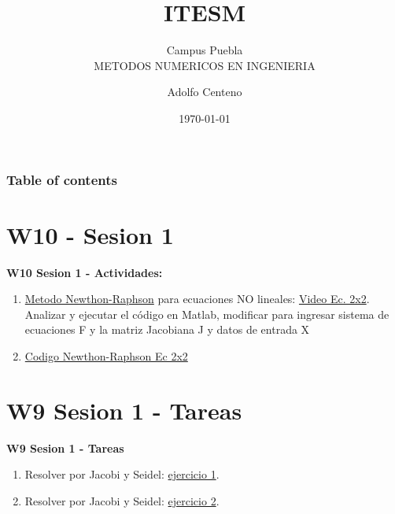 \documentclass{beamer}
\begin{document}
\title{ITESM}  
\subtitle{Campus Puebla\\METODOS NUMERICOS EN INGENIERIA
}
\author{Adolfo Centeno}
\date{\today} 


\begin{frame}
\titlepage
\end{frame}

\begin{frame}\frametitle{Table of contents}
\tableofcontents
\end{frame} 


\section{W10 - Sesion 1 }

\begin{frame}

\textbf{W10 Sesion 1 - Actividades:}

\begin{enumerate}
\item
	\href{https://es.wikipedia.org/wiki/Metodo_de_Jacobi}{Metodo Newthon-Raphson} para ecuaciones NO lineales: \href{https://www.youtube.com/watch?v=QS3wqOQabVY}{Video Ec. 2x2}.\\Analizar y ejecutar el código en Matlab, modificar para ingresar sistema de ecuaciones F y la matriz Jacobiana J y datos de entrada X	

\item
	\href{https://github.com/adsoftsito/metodos-numericos/blob/master/w10/newthon-raphson/newton_raphson_2.m}{Codigo Newthon-Raphson Ec 2x2} 
	

\end{enumerate} 

\end{frame}


\section{W9 Sesion 1 - Tareas }

\begin{frame}


\textbf{W9 Sesion 1 - Tareas}


\begin{enumerate}
\item
	Resolver por Jacobi y Seidel: \href{https://www.youtube.com/watch?v=lEtDw4HUAmY&t=858s}{ejercicio 1}.	
\item
	Resolver por Jacobi y Seidel: \href{https://www.youtube.com/watch?v=k2dB1IVWTng}{ejercicio 2}.	

\end{enumerate} 


\end{frame}
\end{document}
